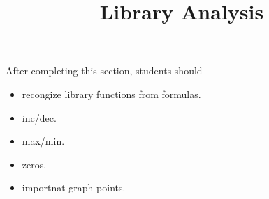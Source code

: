 \documentclass{ximera}
\title{Library Analysis}
\begin{document}
\begin{abstract}
\end{abstract}
\maketitle

\begin{sectionOutcomes}
After completing this section, students should 

\begin{itemize}
\item recongize library functions from formulas.
\item inc/dec.
\item max/min.
\item zeros.
\item importnat graph points.
\end{itemize}
\end{sectionOutcomes}
\end{document}
